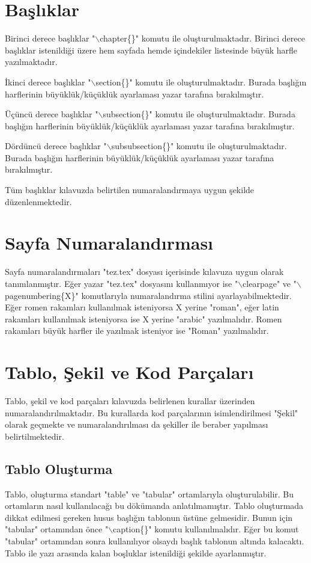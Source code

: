 \chapter{Başlıklar}
Birinci derece başlıklar "$\backslash$chapter\{\}" komutu ile oluşturulmaktadır. Birinci derece başlıklar istenildiği üzere hem sayfada hemde içindekiler listesinde büyük harfle yazılmaktadır. 

İkinci derece başlıklar "$\backslash$section\{\}" komutu ile oluşturulmaktadır. Burada başlığın harflerinin büyüklük/küçüklük ayarlaması yazar tarafına bırakılmıştır.

Üçüncü derece başlıklar "$\backslash$subsection\{\}" komutu ile oluşturulmaktadır. Burada başlığın harflerinin büyüklük/küçüklük ayarlaması yazar tarafına bırakılmıştır.

Dördüncü derece başlıklar "$\backslash$subsubsection\{\}" komutu ile oluşturulmaktadır. Burada başlığın harflerinin büyüklük/küçüklük ayarlaması yazar tarafına bırakılmıştır.

Tüm başlıklar kılavuzda belirtilen numaralandırmaya uygun şekilde düzenlenmektedir. 

\chapter{Sayfa Numaralandırması}
Sayfa numaralandırmaları "tez.tex" dosyası içerisinde kılavuza uygun olarak tanımlanmıştır. Eğer yazar "tez.tex" dosyasını kullanmıyor ise "$\backslash$clearpage" ve "$\backslash$pagenumbering\{X\}" komutlarıyla numaralandırma stilini ayarlayabilmektedir. Eğer romen rakamları kullanılmak isteniyorsa X yerine "roman", eğer latin rakamları kullanılmak isteniyorsa ise X yerine "arabic" yazılmalıdır. Romen rakamları büyük harfler ile yazılmak isteniyor ise "Roman" yazılmalıdır.  

\chapter{Tablo, Şekil ve Kod Parçaları}
Tablo, şekil ve kod parçaları kılavuzda belirlenen kurallar üzerinden numaralandırılmaktadır. Bu kurallarda kod parçalarının isimlendirilmesi "Şekil" olarak geçmekte ve numaralandırılması da şekiller ile beraber yapılması belirtilmektedir. 


\section{Tablo Oluşturma}
Tablo, oluşturma standart "table" ve "tabular" ortamlarıyla oluşturulabilir. Bu ortamların nasıl kullanılacağı bu dökümanda anlatılmamıştır. Tablo oluşturmada dikkat edilmesi gereken husus başlığın tablonun üstüne gelmesidir. Bunun için "tabular" ortamından önce "$\backslash$caption\{\}" komutu kullanılmalıdır. Eğer bu komut "tabular" ortamından sonra kullanılıyor olsaydı başlık tablonun altında kalacaktı. Tablo ile yazı arasında kalan boşluklar istenildiği şekilde ayarlanmıştır. 

